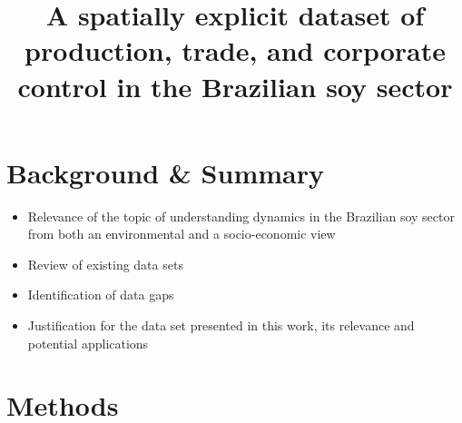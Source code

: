 \documentclass[pdflatex,sn-nature]{sn-jnl}%
\begin{document}
\title[
A spatially explicit dataset of production, trade, and corporate control in the Brazilian soy sector
]
{A spatially explicit dataset of production, trade, and corporate control in the Brazilian soy sector}

\author*[1]{ }
\author*[1]{ }
\author[1]{ }
\author[2]{ }
\author[1]{ }
\author[1]{ }
\author[1]{ }





\maketitle

\section{Background \& Summary}\label{sec:intro}
\begin{itemize}
    \item Relevance of the topic of understanding dynamics in the Brazilian soy sector from both an environmental and a socio-economic view
    \item Review of existing data sets
    \item Identification of data gaps
    \item Justification for the data set presented in this work, its relevance and potential applications
\end{itemize}

\section{Methods}\label{sec:methods-data}
\end{document}
